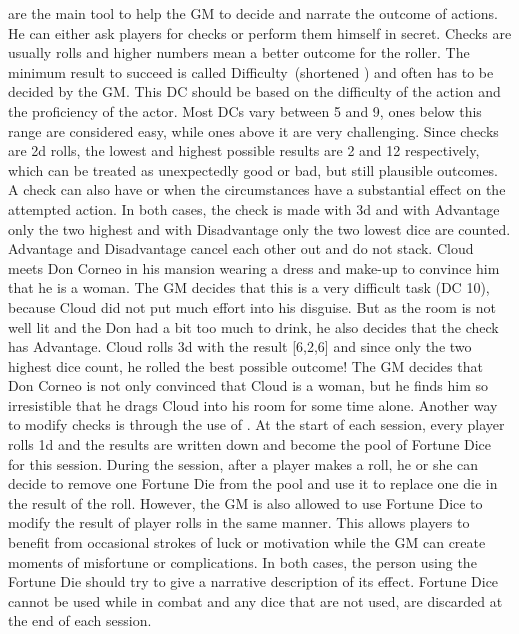  are the main tool to help the GM to decide and narrate the outcome of actions.
He can either ask players for checks or perform them himself in secret.
Checks are usually  rolls and higher numbers mean a better outcome for the roller. 
The minimum result to succeed is called Difficulty~(shortened ) and often has to be decided by the GM.
This DC should be based on the difficulty of the action and the proficiency of the actor.
Most DCs vary between 5 and 9, ones below this range are considered easy, while ones above it are very challenging.
%
\ofpar
%
Since checks are 2d rolls, the lowest and highest possible results are 2 and 12 respectively, which can be treated as unexpectedly good or bad, but still plausible outcomes.
A check can also have  or  when the circumstances have a substantial effect on the attempted action. 
In both cases, the check is made with 3d and with Advantage only the two highest and with Disadvantage only the two lowest dice are counted. 
Advantage and Disadvantage cancel each other out and do not stack.
%
\clearpage
%
{
	Cloud meets Don Corneo in his mansion wearing a dress and make-up to convince him that he is a woman.
	The GM decides that this is a very difficult task (DC 10), because Cloud did not put much effort into his disguise. 
	But as the room is not well lit and the Don had a bit too much to drink, he also decides that the check has Advantage. 
	Cloud rolls 3d with the result [6,2,6] and since only the two highest dice count, he rolled the best possible outcome! 
	The GM decides that Don Corneo is not only convinced that Cloud is a woman, but he finds him so irresistible that he drags Cloud into his room for some time alone.
}
%
\ofpar
%
Another way to modify checks is through the use of .
At the start of each session, every player rolls 1d and the results are written down and become the pool of Fortune Dice for this session.
During the session, after a player makes a roll, he or she can decide to remove one Fortune Die from the pool and use it to replace one die in the result of the roll.
However, the GM is also allowed to use Fortune Dice to modify the result of player rolls in the same manner.
This allows players to benefit from occasional strokes of luck or motivation while the GM can create moments of misfortune or complications.
In both cases, the person using the Fortune Die should try to give a narrative description of its effect.
Fortune Dice cannot be used while in combat and any dice that are not used, are discarded at the end of each session.
